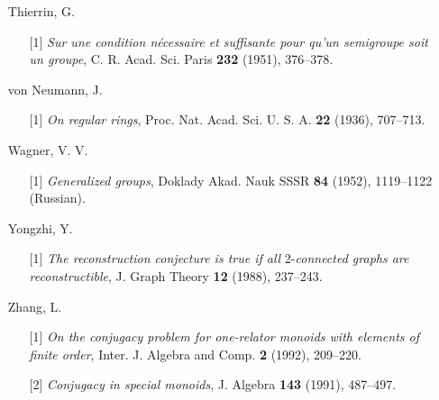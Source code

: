 \documentclass{surv-l}
\numberwithin{equation}{section}
\numberwithin{table}{section}
\numberwithin{figure}{section}
\theoremstyle{definition}
\begin{document}
\begin{enumerate}
\item[] Thierrin, G.
\begin{enumerate}
\item[\hypertarget{bib76}{[1]}] \emph{Sur une condition n\'{e}cessaire et suffisante
pour qu'un semigroupe soit un groupe}, C. R. Acad. Sci.
Paris \textbf{232} (1951), 376--378.
\end{enumerate}

\item[] von Neumann, J.
\begin{enumerate}
\item[\hypertarget{bib77}{[1]}] \emph{On regular rings}, Proc. Nat. Acad. Sci. U. S.
A. \textbf{22} (1936), 707--713.
\end{enumerate}

\item[] Wagner, V. V.
\begin{enumerate}
\item[\hypertarget{bib78}{[1]}] \emph{Generalized groups}, Doklady Akad. Nauk SSSR \textbf{84}
(1952), 1119--1122 (Russian).
\end{enumerate}

\item[] Yongzhi, Y.
\begin{enumerate}
\item[\hypertarget{bib79}{[1]}] \emph{The reconstruction conjecture is true if all}
2-\emph{connected graphs are reconstructible}, J. Graph
Theory \textbf{12} (1988), 237--243.
\end{enumerate}

\item[] Zhang, L.
\begin{enumerate}
\item[\hypertarget{bib80}{[1]}] \emph{On the conjugacy problem for one-relator monoids
with elements of finite order}, Inter. J. Algebra and
Comp. \textbf{2} (1992), 209--220.

\item[\hypertarget{bib80a}{[2]}] \emph{Conjugacy in special monoids}, J. Algebra \textbf{143}
(1991), 487--497.
\end{enumerate}

\end{enumerate}

\printindex
\end{document}
